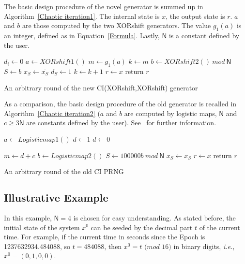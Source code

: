 \documentclass[journal]{IEEEtran}
\begin{document}
The basic design procedure of the novel generator is summed up in Algorithm~\ref{Chaotic iteration1}.
The internal state is $x$, the output state is $r$. $a$ and $b$ are those computed by the two XORshift
generators. The value $g_1(a)$ is an integer, defined as in Equation~\ref{Formula}. Lastly, $\mathsf{N}$ is a constant defined by the user.
\begin{algorithm}
\SetAlgoLined
{}
{
$d_i\leftarrow{0}$\;
}
$a\leftarrow{XORshift1()}$\;
$m\leftarrow{g_1(a)}$\;
$k\leftarrow{m}$\;
{
$b\leftarrow{XORshift2()~mod~\mathsf{N}}$\;
$S\leftarrow{b}$\;
{
$x_S\leftarrow{ \overline{x_S}}$\;
$d_S\leftarrow{1}$\;
}
{
$k\leftarrow{ k+1}$\;
}
}
$r\leftarrow{x}$\;
return $r$\;
\medskip
\caption{An arbitrary round of the new CI(XORshift,XORshift) generator}
\label{Chaotic iteration1}
\end{algorithm}

As a comparison, the basic design procedure of the old generator is recalled in Algorithm~\ref{Chaotic iteration2} ($a$ and $b$ are computed by logistic maps, $\mathsf{N}$ and $c\geqslant 3\mathsf{N}$ are constants defined by the user). See~\cite{wang2009} for further information.

\begin{algorithm}
\SetAlgoLined
{}
$a\leftarrow{Logistic map1()}$\;
{
$d\leftarrow 1$
}
\Else
{
$d\leftarrow 0$
}

$m\leftarrow{d+c}$\;
{
$b\leftarrow{Logistic map2()}$\;
$S\leftarrow{100000b~mod~\mathsf{N}}$\;
$x_S\leftarrow{ \overline{x_S}}$\;
}
$r\leftarrow{x}$\;
return $r$\;
\medskip
\caption{An arbitrary round of the old CI PRNG}
\label{Chaotic iteration2}
\end{algorithm}



\subsection{Illustrative Example}

In this example, $\mathsf{N} = 4$ is chosen for easy understanding.
As stated before, the initial state of the system $x^0$ can be seeded by the decimal part $t$ of the current time.
For example, if the current time in seconds since the Epoch is 1237632934.484088,
so $t = 484088$, then $x^0 = t \text{ ($mod$ 16)}$ in binary digits, \emph{i.e.}, $x^0 = ( 0, 1, 0, 0)$.
\end{document}
